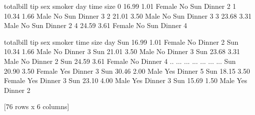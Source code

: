\documentclass[letterpaper,10pt,english]{jupyterBook}
\begin{document}
\begin{sphinxVerbatim}[commandchars=\\\{\}]
  
\end{sphinxVerbatim}

\begin{sphinxVerbatim}[commandchars=\\\{\}]
   total\PYGZus{}bill   tip     sex smoker  day    time  size
0       16.99  1.01  Female     No  Sun  Dinner     2
1       10.34  1.66    Male     No  Sun  Dinner     3
2       21.01  3.50    Male     No  Sun  Dinner     3
3       23.68  3.31    Male     No  Sun  Dinner     2
4       24.59  3.61  Female     No  Sun  Dinner     4
\end{sphinxVerbatim}

\begin{sphinxVerbatim}[commandchars=\\\{\}]
  
\end{sphinxVerbatim}

\begin{sphinxVerbatim}[commandchars=\\\{\}]
\PYG{p}{[}\PYG{p}{]}
\end{sphinxVerbatim}

\begin{sphinxVerbatim}[commandchars=\\\{\}]
     total\PYGZus{}bill   tip     sex smoker    time  size
day                                               
Sun       16.99  1.01  Female     No  Dinner     2
Sun       10.34  1.66    Male     No  Dinner     3
Sun       21.01  3.50    Male     No  Dinner     3
Sun       23.68  3.31    Male     No  Dinner     2
Sun       24.59  3.61  Female     No  Dinner     4
..          ...   ...     ...    ...     ...   ...
Sun       20.90  3.50  Female    Yes  Dinner     3
Sun       30.46  2.00    Male    Yes  Dinner     5
Sun       18.15  3.50  Female    Yes  Dinner     3
Sun       23.10  4.00    Male    Yes  Dinner     3
Sun       15.69  1.50    Male    Yes  Dinner     2

[76 rows x 6 columns]
\end{sphinxVerbatim}
\end{document}
